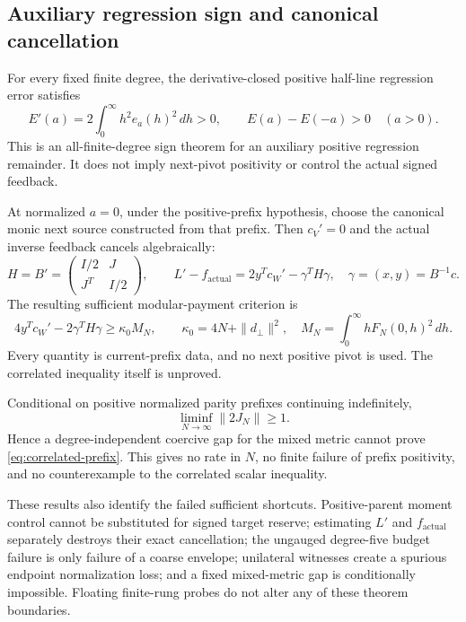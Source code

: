 \documentclass[11pt]{article}
\theoremstyle{definition}
\theoremstyle{remark}
\begin{document}
\subsection{Auxiliary regression sign and canonical cancellation}

For every fixed finite degree, the derivative-closed positive half-line
regression error satisfies
\begin{equation}
 E'(a)=2\int_0^\infty h^2e_a(h)^2\,dh>0,
 \qquad E(a)-E(-a)>0\quad(a>0).
 \label{eq:auxiliary-regression}
\end{equation}
This is an all-finite-degree sign theorem for an auxiliary positive regression
remainder. It does not imply next-pivot positivity or control the actual signed
feedback.

At normalized $a=0$, under the positive-prefix hypothesis, choose the
canonical monic next source constructed from that prefix. Then $c_V'=0$ and
the actual inverse feedback cancels algebraically:
\begin{equation}
 H=B'=\begin{pmatrix}I/2&J\\J^T&I/2\end{pmatrix},
 \qquad
 L'-f_{\mathrm{actual}}
 =2y^Tc_W'-\gamma^TH\gamma,
 \quad \gamma=(x,y)=B^{-1}c.
 \label{eq:canonical-cancellation}
\end{equation}
The resulting sufficient modular-payment criterion is
\begin{equation}
 4y^Tc_W'-2\gamma^TH\gamma
 \ge \kappa_0M_N,
 \qquad
 \kappa_0=4N+\|d_\perp\|^2,
 \quad M_N=\int_0^\infty hF_N(0,h)^2\,dh.
 \label{eq:correlated-prefix}
\end{equation}
Every quantity is current-prefix data, and no next positive pivot is used. The
correlated inequality itself is unproved.

Conditional on positive normalized parity prefixes continuing indefinitely,
\begin{equation}
 \liminf_{N\to\infty}\|2J_N\|\ge1.
 \label{eq:no-mixed-gap}
\end{equation}
Hence a degree-independent coercive gap for the mixed metric cannot prove
\eqref{eq:correlated-prefix}. This gives no rate in $N$, no finite failure of
prefix positivity, and no counterexample to the correlated scalar inequality.

These results also identify the failed sufficient shortcuts. Positive-parent
moment control cannot be substituted for signed target reserve; estimating
$L'$ and $f_{\mathrm{actual}}$ separately destroys their exact cancellation;
the ungauged degree-five budget failure is only failure of a coarse envelope;
unilateral witnesses create a spurious endpoint normalization loss; and a
fixed mixed-metric gap is conditionally impossible. Floating finite-rung
probes do not alter any of these theorem boundaries.
\end{document}
